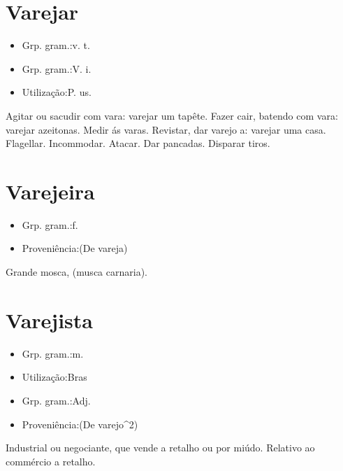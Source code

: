\documentclass{article}
\begin{document}
\section{Varejar}
\begin{itemize}
\item {Grp. gram.:v. t.}
\end{itemize}
\begin{itemize}
\item {Grp. gram.:V. i.}
\end{itemize}
\begin{itemize}
\item {Utilização:P. us.}
\end{itemize}
Agitar ou sacudir com vara: \textunderscore varejar um tapête\textunderscore .
Fazer cair, batendo com vara: \textunderscore varejar azeitonas\textunderscore .
Medir ás varas.
Revistar, dar varejo a: \textunderscore varejar uma casa\textunderscore .
Flagellar.
Incommodar.
Atacar.
Dar pancadas.
Disparar tiros.
\section{Varejeira}
\begin{itemize}
\item {Grp. gram.:f.}
\end{itemize}
\begin{itemize}
\item {Proveniência:(De \textunderscore vareja\textunderscore )}
\end{itemize}
Grande mosca, (\textunderscore musca carnaria\textunderscore ).
\section{Varejista}
\begin{itemize}
\item {Grp. gram.:m.}
\end{itemize}
\begin{itemize}
\item {Utilização:Bras}
\end{itemize}
\begin{itemize}
\item {Grp. gram.:Adj.}
\end{itemize}
\begin{itemize}
\item {Proveniência:(De \textunderscore varejo\textunderscore ^2)}
\end{itemize}
Industrial ou negociante, que vende a retalho ou por miúdo.
Relativo ao commércio a retalho.
\end{document}
